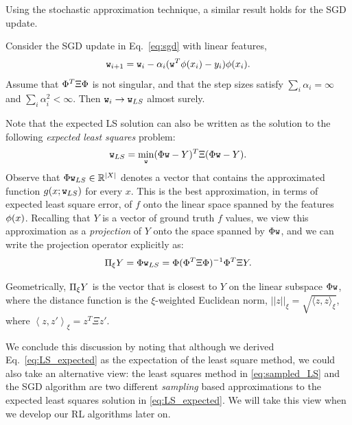 Using the stochastic approximation technique, a similar result holds for the SGD update.
\begin{proposition}
Consider the SGD update in Eq.~\eqref{eq:sgd} with linear features, 
$$
{\tt w}_{i+1} = {\tt w}_i - \alpha_i ( {\tt w}^T \phi(x_i) - y_i)\phi(x_i).
$$
Assume that $\Phi^T \Xi \Phi$ is not singular, and that the step sizes satisfy $\sum_i \alpha_i = \infty$ and $\sum_i \alpha_i^2 < \infty$. Then ${\tt w}_{i} \to {\tt w}_{LS}$ almost surely. 
\end{proposition}

Note that the expected LS solution can also be written as the solution to the following \textit{expected least squares} problem:
\begin{equation}\label{eq:LS_expected}
{\tt w}_{LS} = \min_{\tt w} (\Phi {\tt w} - Y)^T \Xi (\Phi {\tt w} - Y).
\end{equation}
Observe that $\Phi {\tt w}_{LS} \in \mathbb{R}^{|X|}$ denotes a vector that contains the approximated function $g(x;{\tt w}_{LS})$ for every $x$. This is the best approximation, in terms of expected least square error, of $f$ onto the linear space spanned by the features $\phi(x)$. Recalling that $Y$ is a vector of ground truth $f$ values, we view this approximation as a \emph{projection} of $Y$ onto the space spanned by $\Phi {\tt w}$, and we can write the projection operator explicitly as:
$$
\Pi_\xi Y = \Phi {\tt w}_{LS} = \Phi (\Phi^T \Xi \Phi)^{-1} \Phi^T \Xi Y.
$$

Geometrically, $\Pi_\xi Y$ is the vector that is closest to $Y$ on the linear subspace $\Phi {\tt w}$, where the distance function is the $\xi$-weighted Euclidean norm, $||z||_\xi = \sqrt{\langle z,z\rangle_\xi}$, where $\left\langle z, z' \right \rangle_\xi = z^T \Xi z'$.

We conclude this discussion by noting that although we derived Eq.~\eqref{eq:LS_expected} as the expectation of the least square method, we could also take an alternative view: the least squares method in \eqref{eq:sampled_LS} and the SGD algorithm are two different \textit{sampling} based approximations to the expected least squares solution in \eqref{eq:LS_expected}. We will take this view when we develop our RL algorithms later on.


